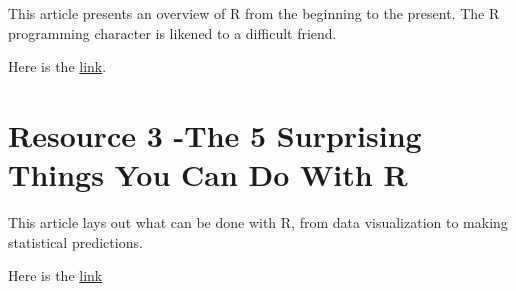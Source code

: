 \documentclass[
  letterpaper,
  DIV=11,
  numbers=noendperiod]{scrreprt}
\begin{document}
This article presents an overview of R from the beginning to the
present. The R programming character is likened to a difficult friend.

Here is the
\href{https://www.ncbi.nlm.nih.gov/pmc/articles/PMC7063554/}{link}.

\hypertarget{resource-3--the-5-surprising-things-you-can-do-with-r}{%
\section{Resource 3 -The 5 Surprising Things You Can Do With
R}\label{resource-3--the-5-surprising-things-you-can-do-with-r}}

This article lays out what can be done with R, from data visualization
to making statistical predictions.

Here is the
\href{https://www.kdnuggets.com/2022/08/5-surprising-things-r.html}{link}
\end{document}
